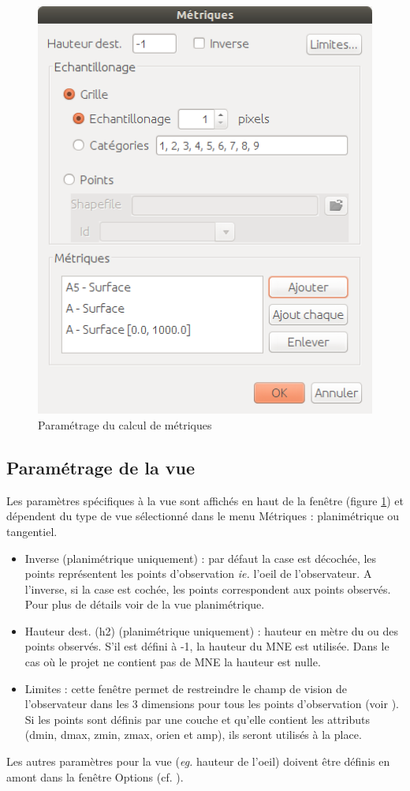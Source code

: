 \documentclass{report}
\begin{document}
\begin{figure}[H]
	\includegraphics[scale=0.5]{img/metrics-fr.png} 
	\caption{Paramétrage du calcul de métriques}
	\label{metrics_dlg}
\end{figure}

\subsection{Paramétrage de la vue}
Les paramètres spécifiques à la vue sont affichés en haut de la fenêtre (figure \ref{metrics_dlg}) et dépendent du type de vue sélectionné dans le menu Métriques : planimétrique ou tangentiel.

\begin{itemize}
	\item Inverse (planimétrique uniquement) : par défaut la case est décochée, les points représentent les points d'observation \textit{ie.} l'oeil de l'observateur. A l'inverse, si la case est cochée, les points correspondent aux points observés. Pour plus de détails voir  de la vue planimétrique.
	\item Hauteur dest. (h2) (planimétrique uniquement) : hauteur en mètre du ou des points observés. S'il est défini à -1, la hauteur du MNE est utilisée. Dans le cas où le projet ne contient pas de MNE la hauteur est nulle.
	\item Limites : cette fenêtre permet de restreindre le champ de vision de l'observateur dans les 3 dimensions pour tous les points d'observation (voir ). Si les points sont définis par une couche et qu'elle contient les attributs (dmin, dmax, zmin, zmax, orien et amp), ils seront utilisés à la place.
\end{itemize}
Les autres paramètres pour la vue (\textit{eg.} hauteur de l'oeil) doivent être définis en amont dans la fenêtre Options (cf. ).
\end{document}
